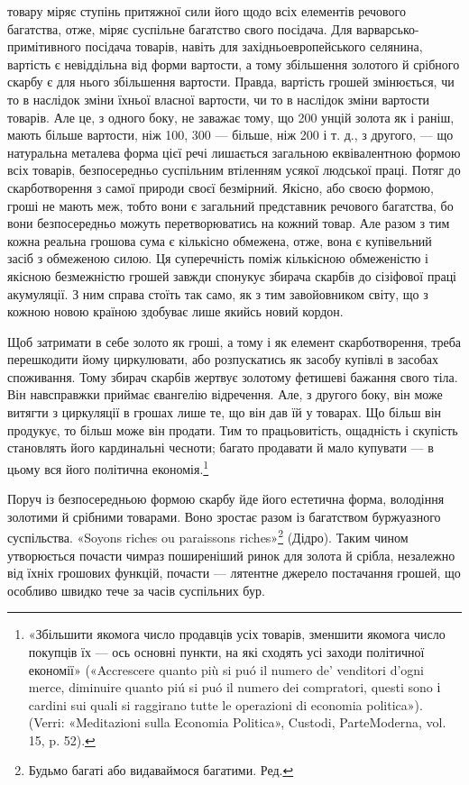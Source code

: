 \parcont{}  %
товару міряє ступінь притяжної сили його щодо всіх елементів
речового багатства, отже, міряє суспільне багатство свого посідача.
Для варварсько-примітивного посідача товарів, навіть
для західньоевропейського селянина, вартість є невіддільна від
форми вартости, а тому збільшення золотого й срібного скарбу
є для нього збільшення вартости. Правда, вартість грошей змінюється,
чи то в наслідок зміни їхньої власної вартости, чи то
в наслідок зміни вартости товарів. Але це, з одного боку, не
заважає тому, що 200 унцій золота як і раніш, мають більше
вартости, ніж 100, 300 — більше, ніж 200 і т. д., з другого, —
що натуральна металева форма цієї речі лишається загальною
еквівалентною формою всіх товарів, безпосередньо суспільним
втіленням усякої людської праці. Потяг до скарботворення з
самої природи своєї безмірний. Якісно, або своєю формою, гроші
не мають меж, тобто вони є загальний представник речового
багатства, бо вони безпосередньо можуть перетворюватись на
кожний товар. Але разом з тим кожна реальна грошова сума є
кількісно обмежена, отже, вона є купівельний засіб з обмеженою
силою. Ця суперечність поміж кількісною обмеженістю і якісною
безмежністю грошей завжди спонукує збирача скарбів до сізіфової
праці акумуляції. З ним справа стоїть так само, як з
тим завойовником світу, що з кожною новою країною здобуває
лише якийсь новий кордон.

Щоб затримати в себе золото як гроші, а тому і як елемент
скарботворення, треба перешкодити йому циркулювати, або розпускатись
як засобу купівлі в засобах споживання. Тому збирач
скарбів жертвує золотому фетишеві бажання свого тіла.
Він навсправжки приймає євангелію відречення. Але, з другого
боку, він може витягти з циркуляції в грошах лише те, що він
дав їй у товарах. Що більш він продукує, то більш може він
продати. Тим то працьовитість, ощадність і скупість становлять
його кардинальні чесноти; багато продавати й мало купувати —
в цьому вся його політична економія.\footnote{
«Збільшити якомога число продавців усіх товарів, зменшити якомога
число покупців їх — ось основні пункти, на які сходять усі заходи
політичної економії» («Accrescere quanto più si puó il numero de’ venditori
d’ogni merce, diminuire quanto piú si puó il numero dei compratori, questi
sono і cardini sui quali si raggirano tutte le operazioni di economia politica»).
(Verri: «Meditazioni sulla Economia Politica», Custodi, ParteModerna,
vol. 15, p. 52).
}

Поруч із безпосередньою формою скарбу йде його естетична
форма, володіння золотими й срібними товарами. Воно зростає
разом із багатством буржуазного суспільства. «Soyons riches
ou paraissons riches»\footnote*{
Будьмо багаті або видаваймося багатими. Ред.
} (Дідро). Таким чином утворюється почасти
чимраз поширеніший ринок для золота й срібла, незалежно від
їхніх грошових функцій, почасти — лятентне джерело постачання
грошей, що особливо швидко тече за часів суспільних бур.

